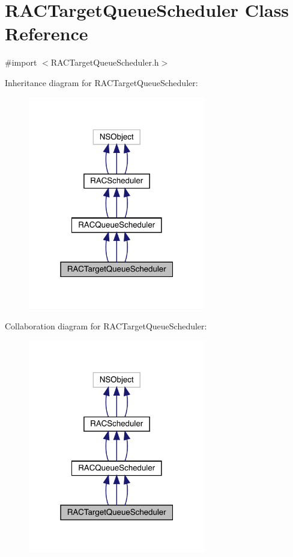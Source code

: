 \hypertarget{interface_r_a_c_target_queue_scheduler}{}\section{R\+A\+C\+Target\+Queue\+Scheduler Class Reference}
\label{interface_r_a_c_target_queue_scheduler}


{\ttfamily \#import $<$R\+A\+C\+Target\+Queue\+Scheduler.\+h$>$}



Inheritance diagram for R\+A\+C\+Target\+Queue\+Scheduler\+:\nopagebreak
\begin{figure}[H]
\begin{center}
\leavevmode
\includegraphics[width=220pt]{interface_r_a_c_target_queue_scheduler__inherit__graph}
\end{center}
\end{figure}


Collaboration diagram for R\+A\+C\+Target\+Queue\+Scheduler\+:\nopagebreak
\begin{figure}[H]
\begin{center}
\leavevmode
\includegraphics[width=220pt]{interface_r_a_c_target_queue_scheduler__coll__graph}
\end{center}
\end{figure}
